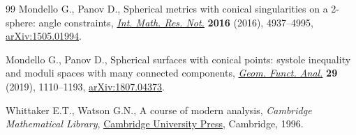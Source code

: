 \documentclass[pdftex]{sigma}
\numberwithin{equation}{section}
\begin{document}
\begin{thebibliography}{99}
Mondello G., Panov D., Spherical metrics with conical singularities on a
 2-sphere: angle constraints, \href{https://doi.org/10.1093/imrn/rnv300}{\textit{Int. Math. Res. Not.}} \textbf{2016}
 (2016), 4937--4995, \href{https://arxiv.org/abs/1505.01994}{arXiv:1505.01994}.

Mondello G., Panov D., Spherical surfaces with conical points: systole
 inequality and moduli spaces with many connected components, \href{https://doi.org/10.1007/s00039-019-00506-3}{\textit{Geom.
 Funct. Anal.}} \textbf{29} (2019), 1110--1193, \href{https://arxiv.org/abs/1807.04373}{arXiv:1807.04373}.

Whittaker E.T., Watson G.N., A course of modern analysis, \textit{Cambridge Mathematical Library}, \href{https://doi.org/10.1017/CBO9780511608759}{Cambridge University Press}, Cambridge, 1996.

\end{thebibliography}\LastPageEnding
\end{document}
